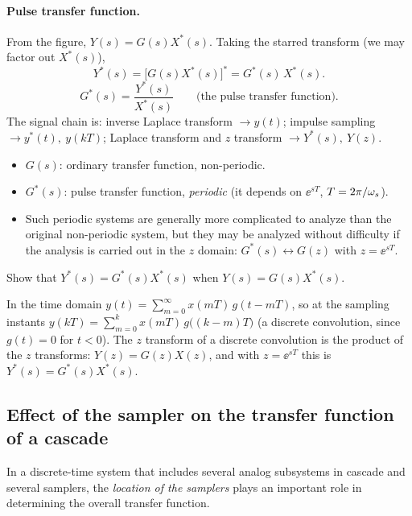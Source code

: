 \paragraph{Pulse transfer function.} From the figure, $Y(s)=G(s)X^{*}(s)$. Taking the starred transform
(we may factor out $X^{*}(s)$),
\begin{equation}
  Y^{*}(s)=\bigl[G(s)X^{*}(s)\bigr]^{*}=G^{*}(s)\,X^{*}(s).
\end{equation}
\begin{equation}
  G^{*}(s)=\frac{Y^{*}(s)}{X^{*}(s)}\qquad\text{(the pulse transfer function).}
\end{equation}
The signal chain is: inverse Laplace transform $\to y(t)$; impulse sampling $\to y^{*}(t),\ y(kT)$;
Laplace transform and $z$ transform $\to Y^{*}(s),\ Y(z)$.

\begin{itemize}
  \item $G(s)$: ordinary transfer function, non-periodic.
  \item $G^{*}(s)$: pulse transfer function, \emph{periodic} (it depends on $\ee^{sT}$, $T=2\pi/\omega_s$).
  \item Such periodic systems are generally more complicated to analyze than the original non-periodic
        system, but they may be analyzed without difficulty if the analysis is carried out in the
        $z$ domain: $G^{*}(s)\leftrightarrow G(z)$ with $z=\ee^{sT}$.
\end{itemize}

\begin{problem}
Show that $Y^{*}(s)=G^{*}(s)X^{*}(s)$ when $Y(s)=G(s)X^{*}(s)$.
\end{problem}
\begin{solution}
In the time domain $y(t)=\sum_{m=0}^{\infty}x(mT)\,g(t-mT)$, so at the sampling instants
$y(kT)=\sum_{m=0}^{k}x(mT)\,g\bigl((k-m)T\bigr)$ (a discrete convolution, since $g(t)=0$ for $t<0$).
The $z$ transform of a discrete convolution is the product of the $z$ transforms:
$Y(z)=G(z)X(z)$, and with $z=\ee^{sT}$ this is $Y^{*}(s)=G^{*}(s)X^{*}(s)$.
\end{solution}

\subsection{Effect of the sampler on the transfer function of a cascade}
In a discrete-time system that includes several analog subsystems in cascade and several samplers, the
\emph{location of the samplers} plays an important role in determining the overall transfer function.

